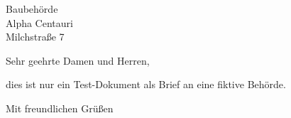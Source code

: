 \documentclass[german,a4,12pt]{scrlttr2}
\begin{document}
\begin{letter}{Baubehörde\\ Alpha Centauri\\ Milchstraße 7}

\opening{Sehr geehrte Damen und Herren,}

dies ist nur ein Test-Dokument als Brief an eine fiktive Behörde.

\closing{Mit freundlichen Grüßen}

\end{letter}
\end{document}
